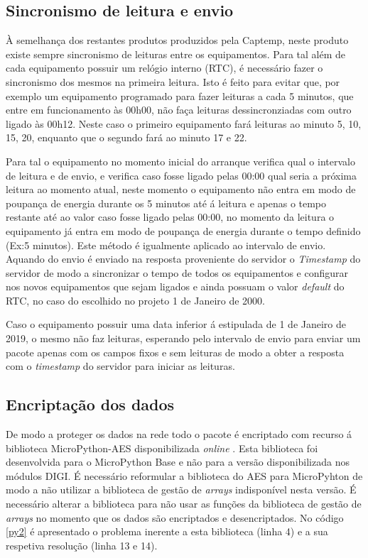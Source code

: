 \subsection {Sincronismo de leitura e envio} \label{sinc}

\par À semelhança dos restantes produtos produzidos pela Captemp, neste produto existe sempre sincronismo de leituras entre os equipamentos. Para tal além de cada equipamento possuir um relógio interno (RTC), é necessário fazer o sincronismo dos mesmos na primeira leitura. Isto é feito para evitar que, por exemplo um equipamento programado para fazer leituras a cada 5 minutos, que entre em funcionamento às 00h00, não faça leituras dessincronziadas com outro ligado às 00h12. Neste caso o primeiro equipamento fará leituras ao minuto 5, 10, 15, 20, enquanto que o segundo fará ao minuto 17 e 22.
\par Para tal o equipamento no momento inicial do arranque verifica qual o intervalo de leitura e de envio, e verifica caso fosse ligado pelas 00:00 qual seria a próxima leitura ao momento atual, neste momento o equipamento não entra em modo de poupança de energia durante os 5 minutos até á leitura e apenas o tempo restante até ao valor caso fosse ligado pelas 00:00, no momento da leitura o equipamento já entra em modo de poupança de energia durante o tempo definido (Ex:5 minutos). Este método é igualmente aplicado ao intervalo de envio. Aquando do envio é enviado na resposta proveniente do servidor o \textit{Timestamp} do servidor de modo a sincronizar o tempo de todos os equipamentos e configurar nos novos equipamentos que sejam ligados e ainda possuam o valor \textit{default} do RTC, no caso do escolhido no projeto 1 de Janeiro de 2000.
\par Caso o equipamento possuir uma data inferior á estipulada de 1 de Janeiro de 2019, o mesmo não faz leituras, esperando pelo intervalo de envio para enviar um pacote apenas com os campos fixos e sem leituras de modo a obter a resposta com o \textit{timestamp} do servidor para iniciar as leituras.


\subsection {Encriptação dos dados}

\par De modo a proteger os dados na rede todo o pacote é encriptado com recurso á biblioteca MicroPython-AES disponibilizada \textit{online} \cite{microaes}. Esta biblioteca foi desenvolvida para o MicroPython Base e não para a versão disponibilizada nos módulos DIGI. É necessário reformular a biblioteca do AES para MicroPyhton de modo a não utilizar a biblioteca de gestão de \textit{arrays} indisponível nesta versão. É necessário alterar a biblioteca para não usar as funções da biblioteca de gestão de \textit{arrays} no momento que os dados são encriptados e desencriptados. No código \ref{py2} é apresentado o problema inerente a esta biblioteca (linha 4) e a sua respetiva resolução (linha 13 e 14).


